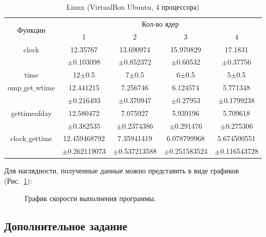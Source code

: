 \documentclass{article}
\begin{document}
		\begin{table}[h!]
		\caption{Linux (VirtualBox Ubuntu, 4 процессора) }			
			\begin{tabular}{|c|c|c|c|c|}
			\hline
			\multirow{2}{*}{Функции} & \multicolumn{4}{|c|}{ Кол-во ядер }\\
			\cline{2-5}
			\qquad 	&  1  &  2  &  3  &  4 \\
			\cline{2-5}
			\hline			
			clock	&	12.35767 	&	13.690974	&	15.970829 	&	17.1831\\
			&$\pm$0.103098&$\pm$0.852372&$\pm$0.60532&$\pm$0.37756\\			
			\hline
			time	&	12$\pm$0.5	&	7$\pm$0.5	&	6$\pm$0.5	&	5$\pm$0.5		\\
			\hline
			omp$\_$get$\_$wtime	&	12.441215	&	7.256746  &	6.124574 &	5.771348\\
			&$\pm$0.216493&$\pm$0.370947&$\pm$0.27953&$\pm$0.1799238\\
			\hline
			gettimeofday	&	12.580472	&	7.075927	&	5.939196	&	5.709618	\\
			&$\pm$0.382535&$\pm$0.2374386&$\pm$0.291476&$\pm$0.275306\\
			\hline
			clock$\_$gettime	&	12.459468792	&	7.35941419	&	6.078799968	& 5.674500551		\\
								&	$\pm$0.262119073&	$\pm$0.537213588&$\pm$0.251583524&$\pm$0.116543728	\\
			\hline
			\end{tabular}		
		\end{table}
		\newpage
		Для наглядности, полученные данные можно представить в виде графиков (Рис.~\ref{ris:Windows_Linux}):

		\begin{figure}[h]
			\caption{График скорости выполнения программы.}
			\label{ris:Windows_Linux}
		\end{figure}
		\newpage
				
		\subsection{Дополнительное задание}		
		
\end{document}
